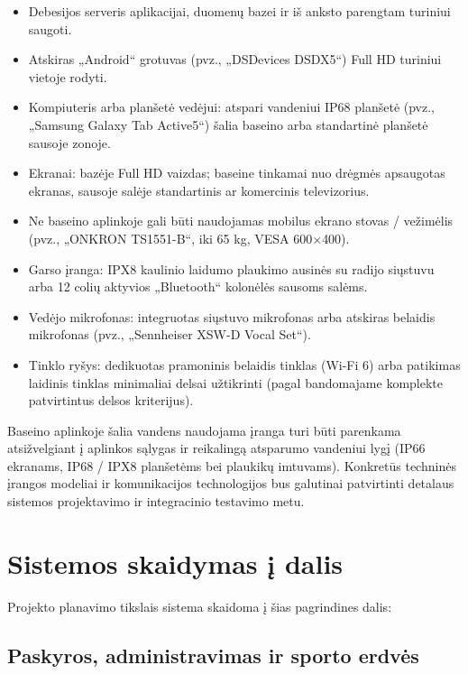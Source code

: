 \documentclass[a4paper,11pt]{article}
\begin{document}
\begin{itemize}
    \item Debesijos serveris aplikacijai, duomenų bazei ir iš anksto parengtam turiniui saugoti.
    \item Atskiras „Android“ grotuvas (pvz., „DSDevices DSDX5“) Full HD turiniui vietoje rodyti.
    \item Kompiuteris arba planšetė vedėjui: atspari vandeniui IP68 planšetė (pvz., „Samsung Galaxy Tab Active5“) šalia baseino arba standartinė planšetė sausoje zonoje.
    \item Ekranai: bazėje Full HD vaizdas; baseine tinkamai nuo drėgmės apsaugotas ekranas, sausoje salėje standartinis ar komercinis televizorius.
    \item Ne baseino aplinkoje gali būti naudojamas mobilus ekrano stovas / vežimėlis (pvz., „ONKRON TS1551-B“, iki 65 kg, VESA 600$\times$400).
    \item Garso įranga: IPX8 kaulinio laidumo plaukimo ausinės su radijo siųstuvu arba 12 colių aktyvios „Bluetooth“ kolonėlės sausoms salėms.
    \item Vedėjo mikrofonas: integruotas siųstuvo mikrofonas arba atskiras belaidis mikrofonas (pvz., „Sennheiser XSW-D Vocal Set“).
    \item Tinklo ryšys: dedikuotas pramoninis belaidis tinklas (Wi-Fi 6) arba patikimas laidinis tinklas minimaliai delsai užtikrinti (pagal bandomajame komplekte patvirtintus delsos kriterijus).
\end{itemize}

Baseino aplinkoje šalia vandens naudojama įranga turi būti parenkama atsižvelgiant į aplinkos sąlygas ir reikalingą atsparumo vandeniui lygį (IP66 ekranams, IP68 / IPX8 planšetėms bei plaukikų imtuvams). Konkretūs techninės įrangos modeliai ir komunikacijos technologijos bus galutinai patvirtinti detalaus sistemos projektavimo ir integracinio testavimo metu.

\section{Sistemos skaidymas į dalis}

Projekto planavimo tikslais sistema skaidoma į šias pagrindines dalis:

\subsection{Paskyros, administravimas ir sporto erdvės}
\end{document}
